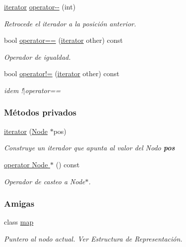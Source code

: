 \begin{DoxyCompactItemize}
\hyperlink{classaed2_1_1map_1_1iterator}{iterator} \hyperlink{classaed2_1_1map_1_1iterator_add45e9ddbb8eeda99326cdb9ac9dd225_add45e9ddbb8eeda99326cdb9ac9dd225}{operator-\/-\/} (int)
\begin{DoxyCompactList}\small\item\em \-Retrocede el iterador a la posición anterior. \end{DoxyCompactList}\item 
bool \hyperlink{classaed2_1_1map_1_1iterator_ad052c1ef8477a1613c292202226053a5_ad052c1ef8477a1613c292202226053a5}{operator==} (\hyperlink{classaed2_1_1map_1_1iterator}{iterator} other) const 
\begin{DoxyCompactList}\small\item\em \-Operador de igualdad. \end{DoxyCompactList}\item 
bool \hyperlink{classaed2_1_1map_1_1iterator_a836c7a166d63f507c4f79085ae953c51_a836c7a166d63f507c4f79085ae953c51}{operator!=} (\hyperlink{classaed2_1_1map_1_1iterator}{iterator} other) const 
\begin{DoxyCompactList}\small\item\em idem !$|$operator== \end{DoxyCompactList}\end{DoxyCompactItemize}
\subsubsection*{\-Métodos privados}
\begin{DoxyCompactItemize}
\item 
\hyperlink{classaed2_1_1map_1_1iterator_ab0ea21abcb32b6d5a72cf341b9029838_ab0ea21abcb32b6d5a72cf341b9029838}{iterator} (\hyperlink{structaed2_1_1map_1_1Node}{\-Node} $\ast$pos)
\begin{DoxyCompactList}\small\item\em \-Construye un iterador que apunta al valor del \-Nodo {\bfseries pos} \end{DoxyCompactList}\item 
\hyperlink{classaed2_1_1map_1_1iterator_a7fe2cdc033cd899dc9fd1da08ac3b39e_a7fe2cdc033cd899dc9fd1da08ac3b39e}{operator Node $\ast$} () const 
\begin{DoxyCompactList}\small\item\em \-Operador de casteo a \-Node$\ast$. \end{DoxyCompactList}\end{DoxyCompactItemize}
\subsubsection*{\-Amigas}
\begin{DoxyCompactItemize}
\item 
class \hyperlink{classaed2_1_1map_1_1iterator_aeda338414e516b47761f994fb78056c6_aeda338414e516b47761f994fb78056c6}{map}
\begin{DoxyCompactList}\small\item\em \-Puntero al nodo actual. \-Ver \-Estructura de \-Representación. \end{DoxyCompactList}\end{DoxyCompactItemize}


